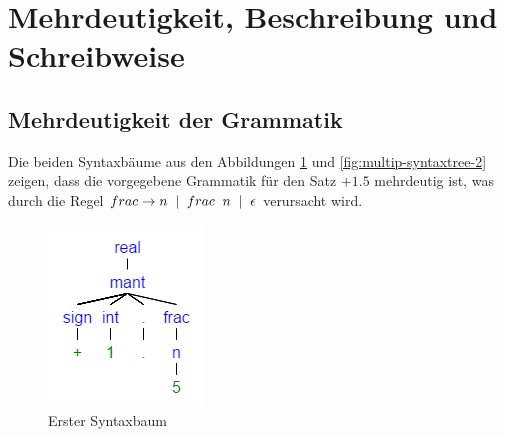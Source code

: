\documentclass[11pt, a4paper, twoside]{article}   	%
\begin{document}
\section{Mehrdeutigkeit, Beschreibung und Schreibweise}
\subsection{Mehrdeutigkeit der Grammatik}
Die beiden Syntaxbäume aus den Abbildungen \ref{fig:multip-syntaxtree-1} und \ref{fig:multip-syntaxtree-2} zeigen, dass die vorgegebene Grammatik für den Satz $+ 1.5$ mehrdeutig ist, was durch die Regel $frac \rightarrow n \hspace{2mm} | \hspace{2mm} frac \hspace{2mm} n \hspace{2mm} | \hspace{2mm} \epsilon $ verursacht wird.
\newline

\begin{figure}[h]
\centering
\includegraphics[scale=0.6]{syntax_tree_real_1.png}
\caption{Erster Syntaxbaum}
\label{fig:multip-syntaxtree-1}
\end{figure}
\end{document}
